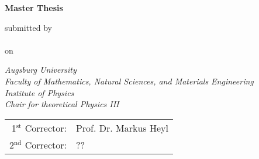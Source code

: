 

\newcommand{\mail}{jonas.kell@student.uni-augsburg.de}



\begin{titlepage}
    
\color{dblue}

\begin{center}
    \vspace*{2cm}
    \Huge
    \textbf{\thetitle}

    \vspace*{1.5cm}
    \color{black}
    \textbf{Master Thesis}

    \vspace*{1cm}
    \normalsize
    submitted by\\
    \LARGE
    \theauthor\\\vspace*{0.3cm}
    \normalsize
    on \thedate

    \vspace{1.8cm}
    \color{black}
    \emph{Augsburg University}\\
    \emph{Faculty of Mathematics, Natural Sciences, and Materials Engineering}\\
    \emph{Institute of Physics}\\
    \emph{Chair for theoretical Physics III}

    \vfill

    \begin{tabular}{rl}
        1$^\text{st}$ Corrector: &Prof. Dr. Markus Heyl\\
        2$^\text{nd}$ Corrector: &??\\ %
    \end{tabular}
\end{center}

\end{titlepage}
